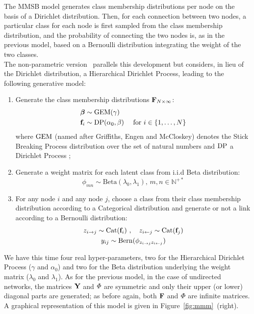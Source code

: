 The MMSB model generates class membership distributions per node on the basis of a Dirichlet distribution. Then, for each connection between two nodes, a particular class for each node is first sampled from the class membership distribution, and the probability of connecting the two nodes is, as in the previous model, based on a Bernoulli distribution integrating the weight of the two classes. 
~\\
The non-parametric version \imb\ parallels this development but considers, in lieu of the Dirichlet distribution, a Hierarchical Dirichlet Process, leading to the following generative model:
%
\begin{enumerate}
\item Generate the class membership distributions $\mathbf{F}_{N \times \infty}$:
   \begin{align}
       \bm{\beta} &\sim \mathrm{GEM}(\gamma) \nonumber \\
    \mathbf{f}_i &\sim \mathrm{DP}(\alpha_0, \beta) \quad\textnormal{ for }  i \in \{1, \dotsc, N\} \nonumber
   \end{align}
where $\mathrm{GEM}$ (named after Griffiths, Engen and McCloskey) denotes the Stick Breaking Process distribution over the set of natural numbers and $\mathrm{DP}$ a Dirichlet Process \cite{HDP};
\item Generate a weight matrix for each latent class from i.i.d Beta distribution:\\
\[ \phi_{mn} \sim \mathrm{Beta}(\lambda_0,\lambda_1), \, m,n \in \mathbb{N}^{+*} \]
\item For any node $i$ and any node $j$, choose a class from their class membership distribution according to a Categorical distribution and generate or not a link according to a Bernoulli distribution:
   \begin{gather*}
    z_{i \rightarrow j} \sim \mbox{Cat}(\mathbf{f}_i) \ , \quad z_{i \leftarrow j} \sim \mbox{Cat}(\mathbf{f}_j) \\
    y_{ij} \sim \mathrm{Bern}(\phi_{z_{i \rightarrow j}z_{i \leftarrow j}})
   \end{gather*}
\end{enumerate}
%
We have this time four real hyper-parameters, two for the Hierarchical Dirichlet Process ($\gamma$ and $\alpha_0$) and two for the Beta distribution underlying the weight matrix ($\lambda_0$ and $\lambda_1$). As for the previous model, in the case of undirected networks, the matrices $\mathbf{Y}$ and $\mat{\Phi}$ are symmetric and only their upper (or lower) diagonal parts are generated; as before again, both $\mathbf{F}$ and $\mat{\Phi}$ are infinite matrices. A graphical representation of this model is given in Figure~\ref{fig:mmm}~(right).

